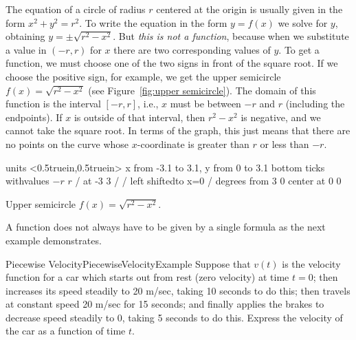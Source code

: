 \begin{solution} 
	The equation of a circle of radius $r$ centered at the origin is usually given in the form
	$x^2+y^2=r^2$.  To write the equation in the form $y=f(x)$ we solve
	for $y$, obtaining $y=\pm\sqrt{r^2-x^2}$.  But {\it this is not a
		function}, because when we substitute a value in $(-r,r)$ for $x$
	there are two corresponding values of $y$.  To get a function, we must
	choose one of the two signs in front of the square root.  If we choose
	the positive sign, for example, we get the upper semicircle
	$f(x)=\sqrt{r^2- x^2}$ (see Figure~\ref{fig:upper semicircle}).  The
	domain of this function is the interval $[-r,r]$, i.e., $x$ must be
	between $-r$ and $r$ (including the endpoints). 
	If $x$ is outside of
	that interval, then $r^2-x^2$ is negative, and we cannot take the
	square root.  In terms of the graph, this just means that there are no
	points on the curve whose $x$-coordinate is greater than $r$ or less
	than $-r$.
	
	\figure[!ht]
	\centerline{\vbox{\beginpicture
			\normalgraphs
			\setcoordinatesystem units <0.5truein,0.5truein>
			\setplotarea x from -3.1 to 3.1, y from 0 to 3.1
			\axis bottom ticks withvalues {$-r$} {$r$} / at -3 3 / /
			\axis left shiftedto x=0 /
			 degrees from 3 0 center at 0 0
			\endpicture}}
	\caption{Upper semicircle $f(x)=\sqrt{r^2- x^2}$. \label{fig:upper semicircle}}
	\endfigure
	
\end{solution}


A function does not always have to be given by a single formula as the next example demonstrates.

\begin{example}{Piecewise Velocity}{PiecewiseVelocityExample}
Suppose that $v(t)$ is the velocity function for a car
which starts out from rest (zero velocity) at time $t=0$; then
increases its speed steadily to 20 m/sec, taking 10 seconds to do
this; then travels at constant speed 20 m/sec for 15 seconds; and
finally applies the brakes to decrease speed steadily to 0, taking 5
seconds to do this. Express the velocity of the car as a function of time $t$.  
\end{example}

